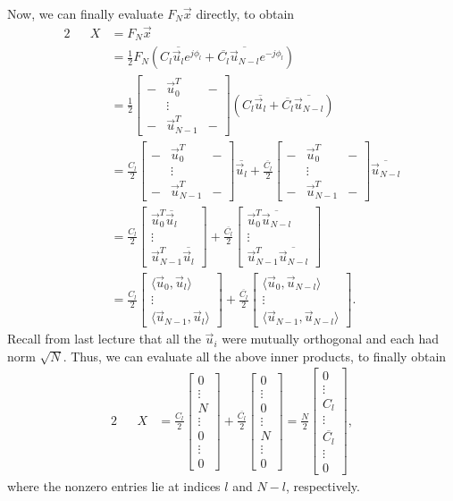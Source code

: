\documentclass[letterpaper]{article}
\theoremstyle{remark}
\newcommand{\mat}[1]{\ensuremath{\begin{bmatrix}#1\end{bmatrix}}}
\newcommand{\eqn}[1]{\begin{alignat*}{2}#1\end{alignat*}}
\begin{document}
Now, we can finally evaluate $F_N\vec{x}$ directly, to obtain
\eqn{
    && X &= F_N \vec{x} \\
    &&&= \frac{1}{2} F_N (C_l\overline{\vec{u}_l} e^{j\phi_l} + \overline{C_l}\overline{\vec{u}_{N-l}} e^{-j\phi_l}) \\
    &&&= \frac{1}{2} \mat{ - & \vec{u}_0^T & - \\ & \vdots & \\ - & \vec{u}_{N-1}^T & - } (C_l\overline{\vec{u}_l} + \overline{C_l}\overline{\vec{u}_{N-l}}) \\
    &&&= \frac{C_l}{2} \mat{ - & \vec{u}_0^T & - \\ & \vdots & \\ - & \vec{u}_{N-1}^T & - } \overline{\vec{u}_l} + \frac{\overline{C_l}}{2} \mat{ - & \vec{u}_0^T & - \\ & \vdots & \\ - & \vec{u}_{N-1}^T & - } \overline{\vec{u}_{N-l}} \\
    &&&= \frac{C_l}{2} \mat{ \vec{u}_0^T\overline{\vec{u}_l} \\ \vdots \\ \vec{u}_{N-1}^T\overline{\vec{u}_l}} + \frac{\overline{C_l}}{2} \mat{ \vec{u}_0^T\overline{\vec{u}_{N - l}} \\ \vdots \\ \vec{u}_{N-1}^T\overline{\vec{u}_{N - l}}} \\
    &&&= \frac{C_l}{2} \mat{\langle \vec{u}_0, \vec{u}_l \rangle \\ \vdots \\ \langle \vec{u}_{N-1}, \vec{u}_l \rangle} + \frac{\overline{C_l}}{2} \mat{\langle \vec{u}_0, \vec{u}_{N-l} \rangle \\ \vdots \\ \langle \vec{u}_{N-1}, \vec{u}_{N-l} \rangle}.
}
Recall from last lecture that all the $\vec{u}_i$ were mutually orthogonal and each had norm $\sqrt{N}$. Thus, we can evaluate all the above inner products, to finally obtain
\eqn{
    && X &= \frac{C_l}{2} \mat{0 \\ \vdots \\ N \\ \vdots \\ 0 \\ \vdots \\ 0} + \frac{\overline{C_l}}{2} \mat{0 \\ \vdots \\ 0 \\ \vdots \\ N \\ \vdots \\ 0} = \frac{N}{2} \mat{0 \\ \vdots \\ C_l \\ \vdots \\ \overline{C_l} \\ \vdots \\ 0},
}
where the nonzero entries lie at indices $l$ and $N - l$, respectively.
\end{document}

